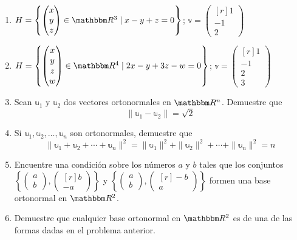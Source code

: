 \begin{enumerate}[start=27]
    \item $H=\left\{\begin{pmatrix*}x \\ y \\ z\end{pmatrix*} \in \RR[3] \mid x-y+z=0\right\}$; $\mathbb{v}=\begin{pmatrix*}[r]1 \\ -1 \\ 2\end{pmatrix*}$
    \item $H=\left\{\begin{pmatrix*}x \\ y \\ z \\ w\end{pmatrix*} \in \RR[4] \mid 2 x-y+3 z-w=0\right\}$; $\mathbb{v}=\begin{pmatrix*}[r]1 \\ -1 \\ 2 \\ 3\end{pmatrix*}$
    \newpage
    \item Sean $\mathbb{u}_{1}$ y $\mathbb{u}_{2}$ dos vectores ortonormales en $\RR[n]$. Demuestre que
    $$\|\mathbb{u}_{1}-\mathbb{u}_{2}\|=\sqrt{2}$$
    \item Si $\mathbb{u}_{1}, \mathbb{u}_{2}, \ldots, \mathbb{u}_{n}$ son ortonormales, demuestre que
    $$\|\mathbb{u}_{1}+\mathbb{u}_{2}+\cdots+\mathbb{u}_{n}\|^{2}=\|\mathbb{u}_{1}\|^{2}+\|\mathbb{u}_{2}\|^{2}+\cdots+\|\mathbb{u}_{n}\|^{2}=n$$
    \item Encuentre una condición sobre los números $a$ y $b$ tales que los conjuntos $\left\{\begin{pmatrix*}a \\ b\end{pmatrix*},\begin{pmatrix*}[r]b \\ -a\end{pmatrix*}\right\}$ y $\left\{\begin{pmatrix*}a \\ b\end{pmatrix*},\begin{pmatrix*}[r]-b \\ a\end{pmatrix*}\right\}$ formen una base ortonormal en $\RR[2]$.
    \item Demuestre que cualquier base ortonormal en $\RR[2]$ es de una de las formas dadas en el problema anterior.

\end{enumerate}
